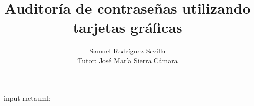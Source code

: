 \documentclass[12pt]{book}
\begin{document}
	
	\title{Auditoría de contraseñas utilizando tarjetas gráficas}
	\author{Samuel Rodríguez Sevilla\\Tutor: José María Sierra Cámara}
	
	\maketitle
	\tableofcontents
	
	
	\begin{empfile}
	\begin{empcmds}
	input metauml;
	\end{empcmds}
	
	\end{empfile}
\end{document}
